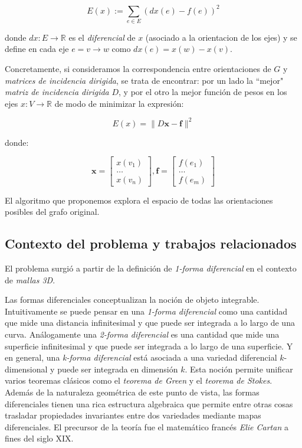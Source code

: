 \documentclass[conference,compsoc,a4paper]{IEEEtran}
\begin{document}
$$E(x) := \sum_{e \in E} (dx(e) - f(e))^2$$

donde $dx: E \rightarrow \mathbb{R}$ es el \textit{diferencial} de $x$ 
(asociado a la orientacion de los ejes) y se define en cada eje 
$e=v\to w$ como $dx(e) = x(w) - x(v)$.

\smallskip

Concretamente, si consideramos la correspondencia entre orientaciones 
de $G$ y \textit{matrices de incidencia dirigida}, se trata de 
encontrar: por un lado la ``mejor" \textit{matriz de incidencia 
dirigida} $D$, y por el otro la mejor función de pesos en los ejes 
$x: V \rightarrow \mathbb{R}$ de modo de minimizar la expresión:

$$E(x) = \|D\bm{x}-\bm{f}\|^2$$

donde:

$$
\bm{x} = 
\begin{bmatrix}
	x(v_1)\\
	\dots \\
	x(v_n)
\end{bmatrix}, 
\bm{f} = 
\begin{bmatrix}
	f(e_1)\\
	\dots \\
	f(e_m)
\end{bmatrix}
$$

El algoritmo que proponemos explora el espacio de todas las 
orientaciones posibles del grafo original.

\subsection{Contexto del problema y trabajos relacionados}
El problema surgió a partir de la definición de \textit{1-forma 
diferencial} en el contexto de \textit{mallas 3D}. 

\bigskip

Las formas diferenciales \cite{S:1965,T:2008} conceptualizan la noción 
de objeto integrable. Intuitivamente se puede pensar en una 
\textit{1-forma diferencial} como una cantidad que mide 
una distancia infinitesimal y que puede ser integrada a lo largo de una 
curva. Análogamente una \textit{2-forma diferencial} es una cantidad 
que mide una superficie infinitesimal y que puede ser integrada a lo 
largo de una superficie. Y en general, una \textit{k-forma diferencial} 
está asociada a una variedad diferencial $k$-dimensional y puede ser 
integrada en dimensión $k$. Esta noción permite unificar varios 
teoremas clásicos como el \textit{teorema de Green} y el \textit{teorema 
de Stokes}. Además de la naturaleza geométrica de este punto de vista, 
las formas diferenciales tienen una rica estructura algebraica que 
permite entre otras cosas trasladar propiedades invariantes entre dos 
variedades mediante mapas diferenciales. El precursor de la 
teoría fue el matemático francés \textit{Elie Cartan} a fines del siglo 
XIX.
\end{document}
